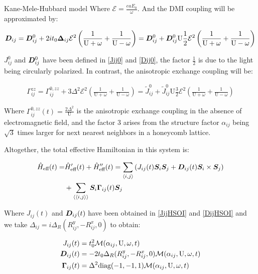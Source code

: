 \begin{section}{Kane-Mele-Hubbard model}
Where $\mathcal{E} = \frac{eaE_0}{\omega}$. And the DMI coupling will be approximated by:

\begin{align*}
\boldsymbol{D}_{ij} = \boldsymbol{D}_{ij}^0 + 2it_0\boldsymbol{\Delta}_{ij}  \mathcal{E}^2 \left( \frac{1}{\text{U}+\omega} + \frac{1}{\text{U}-\omega} \right) = \boldsymbol{D}_{ij}^0 + \boldsymbol{D}_{ij}^0 \text{U}\frac{1}{2} \mathcal{E}^2 \left( \frac{1}{\text{U}+\omega} + \frac{1}{\text{U}-\omega} \right)
\end{align*}

$J_{ij}^0$ and $\boldsymbol{D}_{ij}^0$ have been defined in \ref{Jij0} and \ref{Dij0}, the factor $\frac{1}{2}$ is due to the light being circularly polarized. In contrast, the anisotropic exchange coupling will be:

\begin{align*}
\Gamma^{zz}_{ij} = \Gamma^{0,zz}_{ij} + 3 \Delta^2 \mathcal{E}^2 \left( \frac{1}{\text{U}+\omega} + \frac{1}{\text{U}-\omega} \right) = \tilde{J}_{ij}^0 + \tilde{J}_{ij}^0 \text{U} \frac{3}{2} \mathcal{E}^2 \left( \frac{1}{\text{U}+\omega} + \frac{1}{\text{U}-\omega} \right)
\end{align*}

Where $\Gamma^{0,zz}_{ij}(t) = \frac{2\Delta^2}{\text{U}}$ is the anisotropic exchange coupling in the absence of electromagnetic field, and the factor $3$ arises from the structure factor $\alpha_{ij}$ being $\sqrt{3}$ times larger for next nearest neighbors in a honeycomb lattice. 

Altogether, the total effective Hamiltonian in this system is:

\begin{align}
\hat{H}_{\text{eff}}(t) = &\hat{H}_{\text{eff}}'(t) + \hat{H}_{\text{eff}}''(t) = \sum_{\langle i,j \rangle} \left( J_{ij}(t)\boldsymbol{S}_i\boldsymbol{S}_j + \boldsymbol{D}_{ij}(t) \boldsymbol{S}_i \times \boldsymbol{S}_j \right) \nonumber \\
&+ \sum_{\langle \langle i,j \rangle \rangle} \boldsymbol{S}_i \boldsymbol{\Gamma}_{ij}(t) \boldsymbol{S}_j 
\end{align}

Where $J_{ij}(t)$ and $\boldsymbol{D}_{ij}(t)$ have been obtained in \ref{JijHSOI} and \ref{DijHSOI} and we take $\Delta_{ij} = i\Delta_R (R_{ij}^y, - R_{ij}^x, 0)$ to obtain:

\begin{align*}
J_{ij}(t) &= t_0^2\mathcal{M}(\alpha_{ij}, \text{U}, \omega, t) \\
\boldsymbol{D}_{ij}(t) &= -2t_0\Delta_R (R_{ij}^y, - R_{ij}^x, 0) \mathcal{M}(\alpha_{ij}, \text{U}, \omega, t) \\
\boldsymbol{\Gamma}_{ij}(t) &= \Delta^2 \text{diag}(-1,-1,1) \mathcal{M}(\alpha_{ij}, \text{U}, \omega, t) 
\end{align*}

\end{section}
